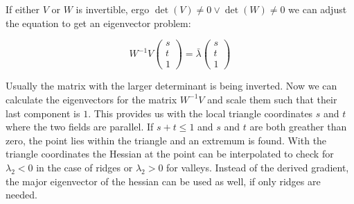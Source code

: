 \noindent If either $V$ or $W$ is invertible, ergo $\det{(V)}\neq 0 \vee
\det{(W)}\neq 0$ we can adjust the equation to get an eigenvector
problem:

\begin{equation}
  W^{-1} V
  \begin{pmatrix}
    s\\
    t\\
    1
  \end{pmatrix}
  = \bar{\lambda}
  \begin{pmatrix}
    s\\
    t\\
    1
  \end{pmatrix}
\end{equation}

\noindent Usually the matrix with the larger determinant is being
inverted. Now we can calculate the eigenvectors for the matrix $W^{-1}
V$ and scale them such that their last component is $1$. This provides
us with the local triangle coordinates $s$ and $t$ where the two fields
are parallel. If $s+t \leq 1$ and $s$ and $t$ are both greather than
zero, the point lies within the triangle and an extremum is found. With
the triangle coordinates the Hessian at the point can be interpolated to
check for $\lambda_2 < 0$ in the case of ridges or $\lambda_2 > 0$ for
valleys. Instead of the derived gradient, the major eigenvector of the
hessian can be used as well, if only ridges are needed.